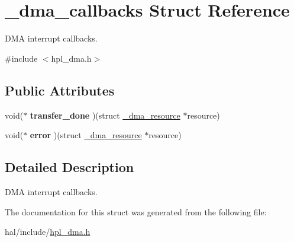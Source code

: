 \hypertarget{struct__dma__callbacks}{}\section{\+\_\+dma\+\_\+callbacks Struct Reference}
\label{struct__dma__callbacks}


D\+MA interrupt callbacks.  




{\ttfamily \#include $<$hpl\+\_\+dma.\+h$>$}

\subsection*{Public Attributes}
\begin{DoxyCompactItemize}
\item 
void($\ast$ {\bfseries transfer\+\_\+done} )(struct \hyperlink{struct__dma__resource}{\+\_\+dma\+\_\+resource} $\ast$resource)
\item 
void($\ast$ {\bfseries error} )(struct \hyperlink{struct__dma__resource}{\+\_\+dma\+\_\+resource} $\ast$resource)
\end{DoxyCompactItemize}


\subsection{Detailed Description}
D\+MA interrupt callbacks. 

The documentation for this struct was generated from the following file\+:\begin{DoxyCompactItemize}
\item 
hal/include/\hyperlink{hpl__dma_8h}{hpl\+\_\+dma.\+h}\end{DoxyCompactItemize}
